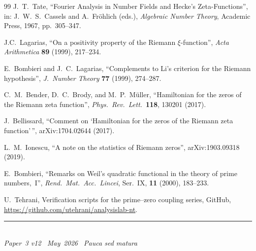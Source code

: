\documentclass[11pt]{article}
\begin{document}
\begin{thebibliography}{99}
J.~T.~Tate,
``Fourier Analysis in Number Fields and Hecke's Zeta-Functions'',
in: J.~W.~S.~Cassels and A.~Fr\"ohlich (eds.),
\emph{Algebraic Number Theory},
Academic Press, 1967, pp.~305--347.

J.C.~Lagarias,
``On a positivity property of the Riemann $\xi$-function'',
\emph{Acta Arithmetica} \textbf{89} (1999), 217--234.

E.~Bombieri and J.~C.~Lagarias,
``Complements to Li's criterion for the Riemann hypothesis'',
\textit{J.\ Number Theory} \textbf{77} (1999), 274--287.

C.~M.~Bender, D.~C.~Brody, and M.~P.~M\"uller,
``Hamiltonian for the zeros of the Riemann zeta function'',
\textit{Phys.\ Rev.\ Lett.}\ \textbf{118}, 130201 (2017).

J.~Bellissard,
``Comment on `Hamiltonian for the zeros of the Riemann zeta function'\,'',
arXiv:1704.02644 (2017).

L.~M.~Ionescu,
``A note on the statistics of Riemann zeros'',
arXiv:1903.09318 (2019).

E.~Bombieri,
``Remarks on Weil's quadratic functional in the theory of prime
numbers,~I'',
\textit{Rend.\ Mat.\ Acc.\ Lincei}, Ser.~IX,
\textbf{11} (2000), 183--233.

U.~Tehrani,
Verification scripts for the prime--zero coupling series,
GitHub, \url{https://github.com/utehrani/analysislab-nt}.

\end{thebibliography}


\enlargethispage{3\baselineskip}
\vspace*{\fill}
\begin{minipage}{\linewidth}
\rule{\linewidth}{0.4pt}\smallskip\\
\small\emph{Paper~3 v12 \textperiodcentered\ May~2026
\textperiodcentered\ Pauca sed matura}
\end{minipage}
\end{document}
